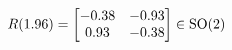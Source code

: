 \documentclass[preview]{standalone}
\begin{document}
\begin{align*}
\special{dvisvgm:raw <g id='unique000'>}R(1.96) = \begin{bmatrix} -0.38 & -0.93 \\ 0.93 & -0.38 \end{bmatrix} \in \text{SO}(2)\special{dvisvgm:raw </g>}
\end{align*}
\end{document}

